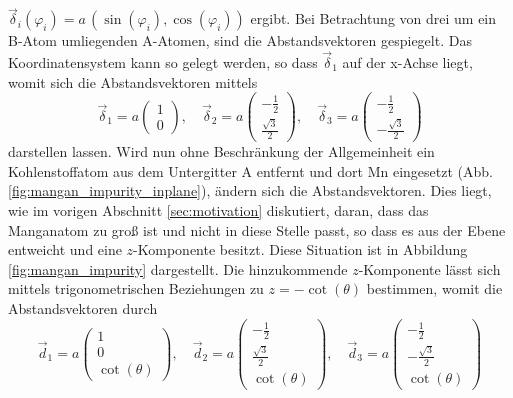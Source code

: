 $\vec{\delta}_i(\varphi_i) = a \, ( \sin (\varphi_i), \cos (\varphi_i) )$
ergibt.
Bei Betrachtung von drei um ein B-Atom umliegenden A-Atomen, sind die Abstandsvektoren gespiegelt.
Das Koordinatensystem kann so gelegt werden, so dass $\vec{\delta}_1$ auf der x-Achse liegt, womit sich die Abstandsvektoren mittels
\begin{equation*}
    \vec{\delta}_1 = a \begin{pmatrix} 1            \\[4pt] 0                   \end{pmatrix}, \quad
    \vec{\delta}_2 = a \begin{pmatrix} -\frac{1}{2} \\[4pt] \frac{\sqrt{3}}{2}  \end{pmatrix}, \quad 
    \vec{\delta}_3 = a \begin{pmatrix} -\frac{1}{2} \\[4pt] -\frac{\sqrt{3}}{2} \end{pmatrix}
\end{equation*}
darstellen lassen.
Wird nun ohne Beschränkung der Allgemeinheit ein Kohlenstoffatom aus dem Untergitter A entfernt und dort Mn eingesetzt (Abb. \ref{fig:mangan_impurity_inplane}), 
ändern sich die Abstandsvektoren. 
Dies liegt, wie im vorigen Abschnitt \ref{sec:motivation} diskutiert, daran, dass das Manganatom zu groß ist und nicht in diese Stelle passt, so dass es aus der Ebene entweicht und 
eine $z$-Komponente besitzt.
Diese Situation ist in Abbildung \ref{fig:mangan_impurity} dargestellt.
Die hinzukommende $z$-Komponente lässt sich mittels trigonometrischen Beziehungen zu $z = -\cot (\theta)$ bestimmen, womit die 
Abstandsvektoren durch 
\begin{equation*}
    \vec{d}_1 = a \begin{pmatrix} 1            \\[4pt] 0                   \\[4pt] \cot (\theta)\end{pmatrix}, \quad
    \vec{d}_2 = a \begin{pmatrix} -\frac{1}{2} \\[4pt] \frac{\sqrt{3}}{2}  \\[4pt] \cot (\theta)\end{pmatrix}, \quad 
    \vec{d}_3 = a \begin{pmatrix} -\frac{1}{2} \\[4pt] -\frac{\sqrt{3}}{2} \\[4pt] \cot (\theta)\end{pmatrix}
\end{equation*}
